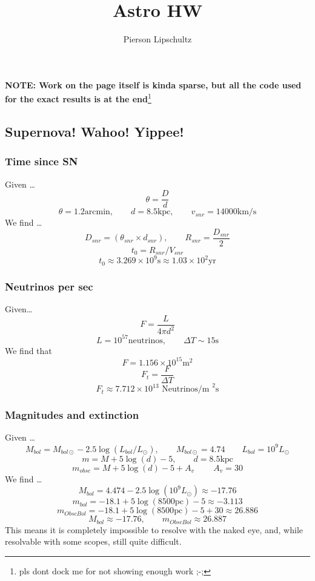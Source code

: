 \documentclass{article}
\title{Astro HW \hwNUM}
\author{Pierson Lipschultz}
\newenvironment{codeblockPython}
    {\VerbatimEnvironment
     \begin{codecell}
     \begin{Verbatim}}
    {\end{Verbatim}
     \end{codecell}}
\newenvironment{codeblockPython}
    {\VerbatimEnvironment
     \begin{codecell}
     \begin{verbatim}}
    {\end{verbatim}
     \end{codecell}}
\def\hwNUM{10}
\begin{document}
\maketitle
\setcounter{section}{\hwNUM}

{\large \textbf{NOTE: Work on the page itself is kinda sparse, but all the code used for the exact results is at the end}\footnote{pls dont dock me for not showing enough work ;-;}}

\subsection{Supernova! Wahoo! Yippee!}

\subsubsection{Time since SN}
Given \dots
\[\theta = \frac{D}{d}\]
\[\theta = 1.2\text{arcmin}, \qquad d = 8.5\text{kpc}, \qquad v_{snr} = 14000\text{km/s}\]
We find \dots
\[D_{snr} = (\theta_{snr} \times d_{snr}), \qquad R_{snr} = \frac{D_{snr}}{2} \]
\[t_0 = R_{snr}/V_{snr}\]
\[
\boxed{
    t_0 \approx 3.269 \times 10^9 \text{s} \approx 1.03 \times 10^2 \text{yr}
}
\]



\subsubsection{Neutrinos per sec}
Given\dots
\[F = \frac{L}{4\pi d^2}\]
\[L = 10^{57} \text{neutrinos}, \qquad \Delta T \sim 15\text{s}\]
We find that
\[F = 1.156 \times 10^{15} \text{m}^2\]
\[F_t = \frac{F}{\Delta T}\] 
\[\boxed{F_t \approx 7.712 \times 10^{13} \text{ Neutrinos/m }^2 \text{s}}\]



\subsubsection{Magnitudes and extinction}
Given \dots
\[M_{bol} = M_{bol\odot} - 2.5 \log(L_{bol}/L_\odot),\qquad M_{bol\odot} = 4.74 \qquad L_{bol} = 10^9 L_\odot\]
\[m = M + 5\log(d) - 5, \qquad d = 8.5\text{kpc} \]
\[m_{obsc} = M + 5\log(d) - 5 + A_v\ \qquad A_v = 30 \]
We find \dots
\[M_{bol} = 4.474 -2.5\log(10^9 L_\odot) \approx -17.76\]
\[m_{bol} = -18.1 + 5 \log(8500\text{pc}) -5 \approx -3.113\]
\[m_{ObscBol} = -18.1 + 5 \log(8500\text{pc}) -5 + 30 \approx 26.886\]
\[\boxed{M_{bol} \approx -17.76, \qquad m_{ObscBol} \approx 26.887}\]
This means it is completely impossible to resolve with the naked eye, and, while resolvable with some scopes, still quite difficult.
\end{document}
